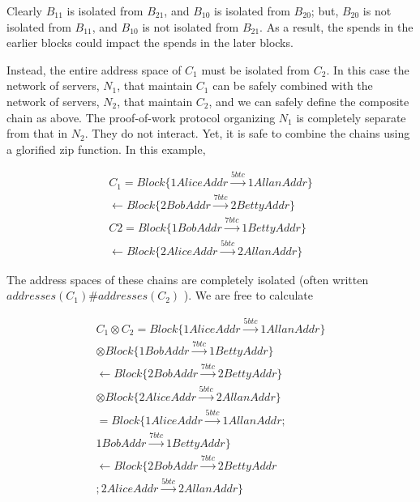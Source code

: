 \documentclass[fleqn]{acm_proc_article-sp}
\numberwithin{equation}{subsection}
\begin{document}
Clearly $B_{11}$ is isolated from $B_{21}$, and $B_{10}$ is isolated
from $B_{20}$; but, $B_{20}$ is not isolated from $B_{11}$, and
$B_{10}$ is not isolated from $B_{21}$. As a result, the spends in the
earlier blocks could impact the spends in the later blocks.

Instead, the entire address space of $C_1$ must be isolated from
$C_2$. In this case the network of servers, $N_1$, that maintain $C_1$ can
be safely combined with the network of servers, $N_2$, that maintain $C_2$,
and we can safely define the composite chain as above. The
proof-of-work protocol organizing $N_1$ is completely separate from that
in $N_2$. They do not interact. Yet, it is safe to combine the chains
using a glorified zip function. In this example,

\begin{equation*}
  \begin{aligned} 
    C_1 = Block\{ 1AliceAddr \xrightarrow{5btc} 1AllanAddr \} \\
    \leftarrow Block\{ 2BobAddr \xrightarrow{7btc} 2BettyAddr \} \\
    C2 = Block\{ 1BobAddr \xrightarrow{7btc} 1BettyAddr \} \\
    \leftarrow Block\{ 2AliceAddr \xrightarrow{5btc} 2AllanAddr \}
  \end{aligned}
\end{equation*}

The address spaces of these chains are completely isolated (often
written $addresses( C_1 ) \# addresses( C_2 )$ ). We are free to calculate

\begin{equation*}
  \begin{aligned} 
    C_1 \otimes C_2  = Block\{ 1AliceAddr \xrightarrow{5btc} 1AllanAddr \} \\
    \otimes Block\{ 1BobAddr \xrightarrow{7btc} 1BettyAddr \}  \\
    \leftarrow Block\{ 2BobAddr \xrightarrow{7btc} 2BettyAddr \} \\
    \otimes Block\{ 2AliceAddr \xrightarrow{5btc} 2AllanAddr \}\\
    = Block\{ 1AliceAddr \xrightarrow{5btc} 1AllanAddr ; \\
    1BobAddr \xrightarrow{7btc} 1BettyAddr \} \\
    \leftarrow Block\{ 2BobAddr \xrightarrow{7btc} 2BettyAddr \\
    ; 2AliceAddr \xrightarrow{5btc} 2AllanAddr \}
  \end{aligned}
\end{equation*}
\end{document}
